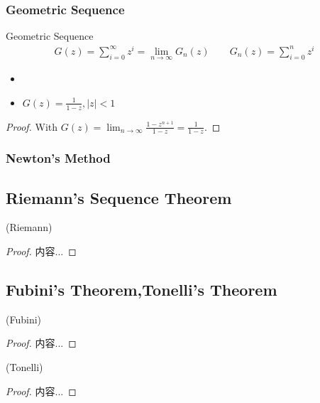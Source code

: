 \documentclass[Total.tex]{subfiles}
\begin{document}
			\subsubsection{Geometric Sequence}
			\begin{Def}
				Geometric Sequence
				\begin{gather*}
					G(z)=\sum_{i=0}^\infty z^i=\lim_{n\rightarrow \infty} G_n(z)\qquad G_n(z)=\sum_{i=0}^n z^i
				\end{gather*}
			\end{Def}
			
			\begin{proposition}
				\begin{itemize}
					\item 
					\item $G(z)=\frac{1}{1-z},|z|<1$
				\end{itemize}
			\end{proposition}
			\begin{proof}
				With $G(z)=\lim_{n\rightarrow \infty} \frac{1-z^{n+1}}{1-z}=\frac{1}{1-z}$.
			\end{proof}
			\subsubsection{Newton's Method}
			
			\subsection{Riemann's Sequence Theorem}
				\begin{theorem}
					(Riemann)
				\end{theorem}
				\begin{proof}
					内容...
				\end{proof}
			\subsection{Fubini's Theorem,Tonelli's Theorem}
			
				\begin{theorem}
					(Fubini)
				\end{theorem}
				\begin{proof}
					内容...
				\end{proof}
				
				\begin{theorem}
					(Tonelli) 
				\end{theorem}
				\begin{proof}
					内容...
				\end{proof}
\end{document}
